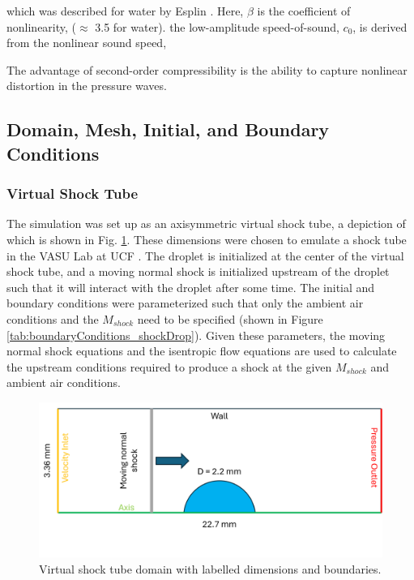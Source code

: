 \documentclass{UCF_ETD}
\begin{document}
\noindent which was described for water by Esplin \cite{Esplin2016, esplin2016bulk}. Here, $\beta$ is the coefficient of nonlinearity, ($\approx$ 3.5 for water). the low-amplitude speed-of-sound, $c_{0}$, is derived from the nonlinear sound speed,


\noindent The advantage of second-order compressibility is the ability to capture nonlinear distortion in the pressure waves.

\subsection{Domain, Mesh, Initial, and Boundary Conditions}
\subsubsection{Virtual Shock Tube}
\label{sec:domain_mesh}
The simulation was set up as an axisymmetric virtual shock tube, a depiction of which is shown in Fig. \ref{fig:domain}. These dimensions were chosen to emulate a shock tube in the VASU Lab at UCF \cite{Briggs2024}. The droplet is initialized at the center of the virtual shock tube, and a moving normal shock is initialized upstream of the droplet such that it will interact with the droplet after some time. The initial and boundary conditions were parameterized such that only the ambient air conditions and the $M_{shock}$ need to be specified (shown in Figure \ref{tab:boundaryConditions_shockDrop}). Given these parameters, the moving normal shock equations and the isentropic flow equations \cite{john2006gas} are used to calculate the upstream conditions required to produce a shock at the given $M_{shock}$ and ambient air conditions.



\begin{figure}[htp!]
\centering
\includegraphics[width=.75\textwidth]{Figures/domain.png}
\caption{Virtual shock tube domain with labelled dimensions and boundaries.}
\label{fig:domain}
\end{figure}
\end{document}
